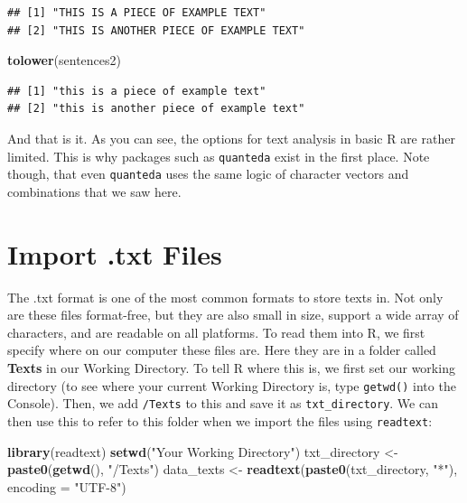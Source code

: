 \documentclass[
]{book}
\newenvironment{Shaded}{\begin{snugshade}}{\end{snugshade}}
\newcommand{\AttributeTok}[1]{\textcolor[rgb]{0.13,0.29,0.53}{#1}}
\newcommand{\FunctionTok}[1]{\textcolor[rgb]{0.13,0.29,0.53}{\textbf{#1}}}
\newcommand{\NormalTok}[1]{#1}
\newcommand{\OtherTok}[1]{\textcolor[rgb]{0.56,0.35,0.01}{#1}}
\newcommand{\StringTok}[1]{\textcolor[rgb]{0.31,0.60,0.02}{#1}}
\begin{document}
\begin{verbatim}
## [1] "THIS IS A PIECE OF EXAMPLE TEXT"      
## [2] "THIS IS ANOTHER PIECE OF EXAMPLE TEXT"
\end{verbatim}

\begin{Shaded}
\begin{Highlighting}[]
\FunctionTok{tolower}\NormalTok{(sentences2)}
\end{Highlighting}
\end{Shaded}

\begin{verbatim}
## [1] "this is a piece of example text"      
## [2] "this is another piece of example text"
\end{verbatim}

And that is it. As you can see, the options for text analysis in basic R are rather limited. This is why packages such as \texttt{quanteda} exist in the first place. Note though, that even \texttt{quanteda} uses the same logic of character vectors and combinations that we saw here.

\section{Import .txt Files}\label{import-.txt-files}

The .txt format is one of the most common formats to store texts in. Not only are these files format-free, but they are also small in size, support a wide array of characters, and are readable on all platforms. To read them into R, we first specify where on our computer these files are. Here they are in a folder called \textbf{Texts} in our Working Directory. To tell R where this is, we first set our working directory (to see where your current Working Directory is, type \texttt{getwd()} into the Console). Then, we add \texttt{/Texts} to this and save it as \texttt{txt\_directory}. We can then use this to refer to this folder when we import the files using \texttt{readtext}:

\begin{Shaded}
\begin{Highlighting}[]
\FunctionTok{library}\NormalTok{(readtext)}
\FunctionTok{setwd}\NormalTok{(}\StringTok{"Your Working Directory"}\NormalTok{)}
\NormalTok{txt\_directory }\OtherTok{\textless{}{-}} \FunctionTok{paste0}\NormalTok{(}\FunctionTok{getwd}\NormalTok{(), }\StringTok{"/Texts"}\NormalTok{)}
\NormalTok{data\_texts }\OtherTok{\textless{}{-}} \FunctionTok{readtext}\NormalTok{(}\FunctionTok{paste0}\NormalTok{(txt\_directory, }\StringTok{"*"}\NormalTok{), }\AttributeTok{encoding =} \StringTok{"UTF{-}8"}\NormalTok{)}
\end{Highlighting}
\end{Shaded}
\end{document}
